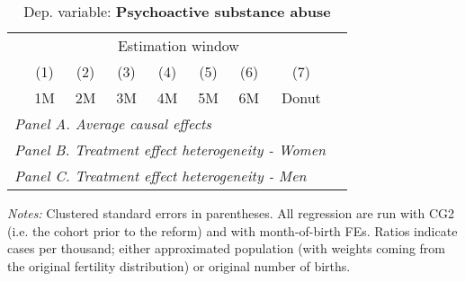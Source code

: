  \begin{table}[H] \begin{threeparttable} \centering \caption{Dep. variable: \textbf{Psychoactive substance abuse}} {\def\sym#1{\ifmmode^{#1}\else\(^{#1}\)\fi} \begin{tabular}{l*{8}{c}} \toprule & \multicolumn{7}{c}{Estimation window} \\ \cmidrule(lr){2-8}
            &\multicolumn{1}{c}{(1)}&\multicolumn{1}{c}{(2)}&\multicolumn{1}{c}{(3)}&\multicolumn{1}{c}{(4)}&\multicolumn{1}{c}{(5)}&\multicolumn{1}{c}{(6)}&\multicolumn{1}{c}{(7)}\\
            &\multicolumn{1}{c}{1M}&\multicolumn{1}{c}{2M}&\multicolumn{1}{c}{3M}&\multicolumn{1}{c}{4M}&\multicolumn{1}{c}{5M}&\multicolumn{1}{c}{6M}&\multicolumn{1}{c}{Donut}\\
\midrule
 \multicolumn{8}{l}{\emph{Panel A. Average causal effects}} \\       \midrule\multicolumn{8}{l}{\emph{Panel B. Treatment effect heterogeneity - Women}} \\       \midrule\multicolumn{8}{l}{\emph{Panel C. Treatment effect heterogeneity - Men}} \\       
\bottomrule \end{tabular} } \begin{tablenotes} \item \scriptsize \emph{Notes:} Clustered standard errors in parentheses. All regression are run with CG2 (i.e. the cohort prior to the reform) and with month-of-birth FEs. Ratios indicate cases per thousand; either approximated population (with weights coming from the original fertility distribution) or original number of births. \end{tablenotes} \end{threeparttable} \end{table} 
